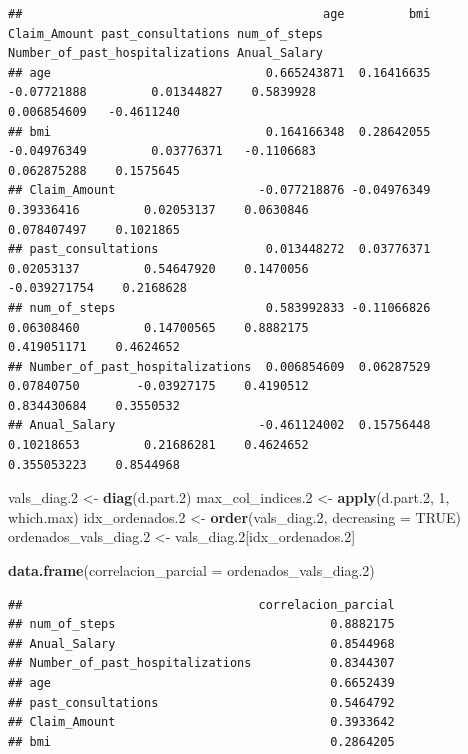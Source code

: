 \documentclass[
]{article}
\newenvironment{Shaded}{\begin{snugshade}}{\end{snugshade}}
\newcommand{\AttributeTok}[1]{\textcolor[rgb]{0.13,0.29,0.53}{#1}}
\newcommand{\ConstantTok}[1]{\textcolor[rgb]{0.56,0.35,0.01}{#1}}
\newcommand{\DecValTok}[1]{\textcolor[rgb]{0.00,0.00,0.81}{#1}}
\newcommand{\FloatTok}[1]{\textcolor[rgb]{0.00,0.00,0.81}{#1}}
\newcommand{\FunctionTok}[1]{\textcolor[rgb]{0.13,0.29,0.53}{\textbf{#1}}}
\newcommand{\NormalTok}[1]{#1}
\newcommand{\OtherTok}[1]{\textcolor[rgb]{0.56,0.35,0.01}{#1}}
\begin{document}
\begin{verbatim}
##                                          age         bmi Claim_Amount past_consultations num_of_steps Number_of_past_hospitalizations Anual_Salary
## age                              0.665243871  0.16416635  -0.07721888         0.01344827    0.5839928                     0.006854609   -0.4611240
## bmi                              0.164166348  0.28642055  -0.04976349         0.03776371   -0.1106683                     0.062875288    0.1575645
## Claim_Amount                    -0.077218876 -0.04976349   0.39336416         0.02053137    0.0630846                     0.078407497    0.1021865
## past_consultations               0.013448272  0.03776371   0.02053137         0.54647920    0.1470056                    -0.039271754    0.2168628
## num_of_steps                     0.583992833 -0.11066826   0.06308460         0.14700565    0.8882175                     0.419051171    0.4624652
## Number_of_past_hospitalizations  0.006854609  0.06287529   0.07840750        -0.03927175    0.4190512                     0.834430684    0.3550532
## Anual_Salary                    -0.461124002  0.15756448   0.10218653         0.21686281    0.4624652                     0.355053223    0.8544968
\end{verbatim}

\begin{Shaded}
\begin{Highlighting}[]
\NormalTok{vals\_diag}\FloatTok{.2} \OtherTok{\textless{}{-}} \FunctionTok{diag}\NormalTok{(d.part}\FloatTok{.2}\NormalTok{)}
\NormalTok{max\_col\_indices}\FloatTok{.2} \OtherTok{\textless{}{-}} \FunctionTok{apply}\NormalTok{(d.part}\FloatTok{.2}\NormalTok{, }\DecValTok{1}\NormalTok{, which.max)}
\NormalTok{idx\_ordenados}\FloatTok{.2} \OtherTok{\textless{}{-}} \FunctionTok{order}\NormalTok{(vals\_diag}\FloatTok{.2}\NormalTok{, }\AttributeTok{decreasing =} \ConstantTok{TRUE}\NormalTok{)}
\NormalTok{ordenados\_vals\_diag}\FloatTok{.2} \OtherTok{\textless{}{-}}\NormalTok{ vals\_diag}\FloatTok{.2}\NormalTok{[idx\_ordenados}\FloatTok{.2}\NormalTok{]}

\FunctionTok{data.frame}\NormalTok{(}\AttributeTok{correlacion\_parcial =}\NormalTok{ ordenados\_vals\_diag}\FloatTok{.2}\NormalTok{)}
\end{Highlighting}
\end{Shaded}

\begin{verbatim}
##                                 correlacion_parcial
## num_of_steps                              0.8882175
## Anual_Salary                              0.8544968
## Number_of_past_hospitalizations           0.8344307
## age                                       0.6652439
## past_consultations                        0.5464792
## Claim_Amount                              0.3933642
## bmi                                       0.2864205
\end{verbatim}
\end{document}
